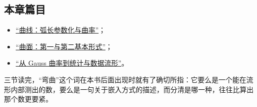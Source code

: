 \subsection{本章篇目}

\begin{itemize}
\tightlist
\item \hyperref[sec:12-Real-Analysis-Support/11-Curve-and-Surface-Geometry/01]{``曲线：弧长参数化与曲率''}；
\item \hyperref[sec:12-Real-Analysis-Support/11-Curve-and-Surface-Geometry/02]{``曲面：第一与第二基本形式''}；
\item \hyperref[sec:12-Real-Analysis-Support/11-Curve-and-Surface-Geometry/03]{``从 Gauss 曲率到统计与数据流形''}。
\end{itemize}

三节读完，``弯曲''这个词在本书后面出现时就有了确切所指：它要么是一个能在流形内部测出的数，要么是一句关于嵌入方式的描述，而分清是哪一种，往往比算出那个数更要紧。
